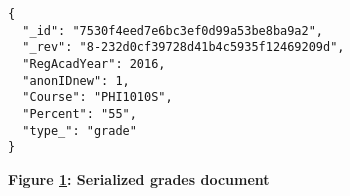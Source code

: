 \begin{figure}[H]
  \centering
  \begin{mdframed}
    \centering
    \begin{verbatim}
{
  "_id": "7530f4eed7e6bc3ef0d99a53be8ba9a2",
  "_rev": "8-232d0cf39728d41b4c5935f12469209d",
  "RegAcadYear": 2016,
  "anonIDnew": 1,
  "Course": "PHI1010S",
  "Percent": "55",
  "type_": "grade"
}    
        \end{verbatim}
  \end{mdframed}
  \caption[Serialized grades document]{\textbf{Figure \ref{fig-json-grade}: Serialized grades document}}
  \label{fig-json-grade}
\end{figure}